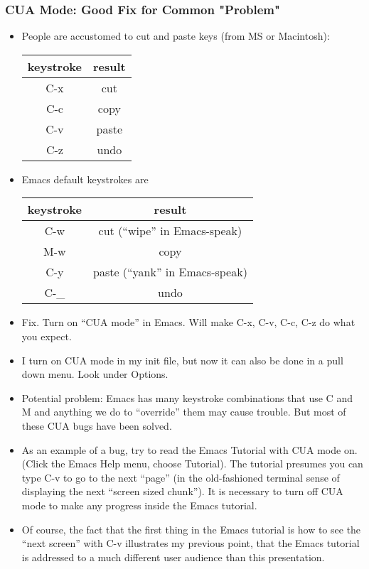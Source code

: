 \documentclass[11pt,english]{beamer}
\providecommand{\tabularnewline}{\\}
\begin{document}
\begin{frame}
  \frametitle{CUA Mode: Good Fix for Common "Problem"}
  \begin{itemize}
  \item People are accustomed to cut and paste keys (from MS or Macintosh):


    \begin{tabular}{|c|c|}
      \hline 
      keystroke &
      result\tabularnewline
      \hline 
      \hline 
      C-x &
      cut\tabularnewline
      \hline
      C-c &
      copy\tabularnewline
      \hline 
      C-v &
      paste\tabularnewline
      \hline 
      C-z &
      undo\tabularnewline
      \hline 
    \end{tabular}

  \item Emacs default keystrokes are


    \begin{tabular}{|c|c|}
      \hline 
      keystroke &
      result\tabularnewline
      \hline 
      \hline 
      C-w &
      cut (``wipe'' in Emacs-speak)\tabularnewline
      \hline 
      M-w &
      copy\tabularnewline
      \hline 
      C-y &
      paste (``yank'' in Emacs-speak)\tabularnewline
      \hline 
      C-\_ &
      undo\tabularnewline
      \hline 
    \end{tabular}

  \item Fix. Turn on ``CUA mode'' in Emacs. Will make C-x, C-v, C-c, C-z
    do what you expect.
  \item I turn on CUA mode in my init file, but now it can also be
    done in a pull down menu. Look under Options.
  \item Potential problem: Emacs has many keystroke combinations
    that use C and M and anything we do to ``override'' them may cause
    trouble. But most of these CUA bugs have been solved.
  \item As an example of a bug, try to read the Emacs Tutorial with CUA mode
    on. (Click the Emacs Help menu, choose Tutorial). The tutorial presumes
    you can type C-v to go to the next ``page'' (in the old-fashioned
    terminal sense of displaying the next ``screen sized chunk''). It
    is necessary to turn off CUA mode to make any progress inside the
    Emacs tutorial.
  \item Of course, the fact that the first thing in the Emacs tutorial is
    how to see the ``next screen'' with C-v illustrates my previous
    point, that the Emacs tutorial is addressed to a much different user
    audience than this presentation.
  \end{itemize}
\end{frame}
\end{document}
